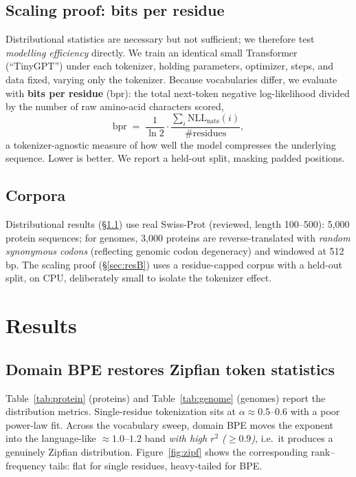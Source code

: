 \documentclass[11pt]{article}
\begin{document}
\subsection{Scaling proof: bits per residue}
Distributional statistics are necessary but not sufficient; we therefore test
\emph{modelling efficiency} directly. We train an identical small Transformer
(``TinyGPT'') under each tokenizer, holding parameters, optimizer, steps, and
data fixed, varying only the tokenizer. Because vocabularies differ, we evaluate
with \textbf{bits per residue} (bpr): the total next-token negative
log-likelihood divided by the number of raw amino-acid characters scored,
\[
\text{bpr} \;=\; \frac{1}{\ln 2}\cdot\frac{\sum_i \mathrm{NLL}_{\text{nats}}(i)}{\#\text{residues}},
\]
a tokenizer-agnostic measure of how well the model compresses the underlying
sequence. Lower is better. We report a held-out split, masking padded positions.

\subsection{Corpora}
Distributional results (\S\ref{sec:resA}) use real Swiss-Prot (reviewed, length
100--500): 5{,}000 protein sequences; for genomes, 3{,}000 proteins are
reverse-translated with \emph{random synonymous codons} (reflecting genomic
codon degeneracy) and windowed at 512\,bp. The scaling proof (\S\ref{sec:resB})
uses a residue-capped corpus with a held-out split, on CPU, deliberately small
to isolate the tokenizer effect.

\section{Results}
\subsection{Domain BPE restores Zipfian token statistics}
\label{sec:resA}
Table~\ref{tab:protein} (proteins) and Table~\ref{tab:genome} (genomes) report
the distribution metrics. Single-residue tokenization sits at
$\alpha\approx0.5$--$0.6$ with a poor power-law fit. Across the vocabulary sweep,
domain BPE moves the exponent into the language-like $\approx1.0$--$1.2$ band
\emph{with high $r^2$ ($\geq0.9$)}, i.e.\ it produces a genuinely Zipfian
distribution. Figure~\ref{fig:zipf} shows the corresponding rank--frequency
tails: flat for single residues, heavy-tailed for BPE.
\end{document}
